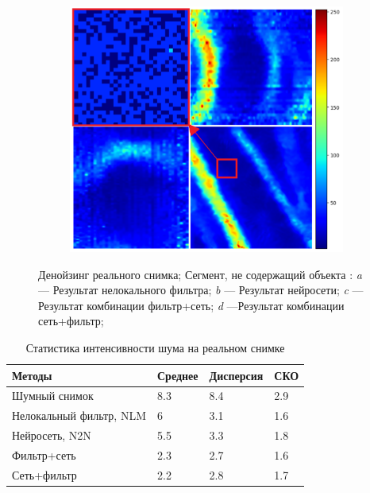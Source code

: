 \begin{figure}[H]
\begin{subfigure}[t]{\dimexpr.5\linewidth-1.3em\relax}
	\end{subfigure}%
	\hfill %
	\begin{subfigure}[t]{\dimexpr.5\linewidth-1.3em\relax}
		\centering
		\includegraphics[width=.95\linewidth,valign=t]{my_folder/images/denoising/n2n_nlm_part_color.png}
	\end{subfigure}
	\captionsetup{justification=centering} %
	\caption{Денойзинг реального снимка; Сегмент, не содержащий объекта : {\itshape a} --- Результат нелокального фильтра; {\itshape b} --- Результат нейросети; {\itshape c} --- Результат комбинации фильтр+сеть; {\itshape d} ---Результат комбинации сеть+фильтр;} 
	\label{fig:real-segment}
\end{figure}
\begin{table} [H]%
	\centering\small
	\caption{Статистика интенсивности шума на реальном снимке}%
	\label{tab:real-segment}		
	\begin{tabular}{|l|l|l|l|}
		\hline
		Методы&Среднее&Дисперсия&СКО\\
		\hline	
		Шумный снимок
		&8.3&8.4&2.9\\ \hline
		Нелокальный фильтр, NLM
		&6&3.1&1.6\\ \hline
		Нейросеть, N2N&5.5&3.3&1.8\\ \hline
		Фильтр+сеть
		&2.3&2.7&1.6\\ \hline Сеть+фильтр
		&2.2&2.8&1.7\\ \hline			
	\end{tabular}
	\normalsize%
\end{table}
